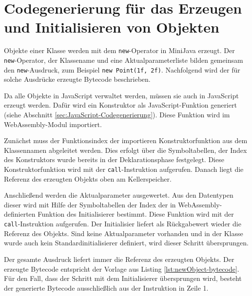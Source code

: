 





\section{Codegenerierung für das Erzeugen und Initialisieren von Objekten}
\label{sec:Codegenerierung-für-das-Erzeugen-und-Initialisieren-von-Objekten}
Objekte einer Klasse werden mit dem \lstinline{new}-Operator in MiniJava erzeugt. Der \lstinline{new}-Operator, der Klassename und eine Aktualparameterliste bilden gemeinsam den \lstinline{new}-Ausdruck, zum Beispiel \lstinline{new Point(1f, 2f)}. Nachfolgend wird der für solche Ausdrücke erzeugte Bytecode beschrieben.

Da alle Objekte in JavaScript verwaltet werden, müssen sie auch in JavaScript erzeugt werden. Dafür wird ein Konstruktor als JavaScript-Funktion generiert (siehe Abschnitt \ref{sec:JavaScript-Codegenerierung}). Diese Funktion wird im WebAssembly-Modul importiert.

Zunächst muss der Funktionsindex der importieren Konstruktorfunktion aus dem Klassennamen abgeleitet werden. Dies erfolgt über die Symboltabellen, der Index des Konstruktors wurde bereits in der Deklarationsphase festgelegt. Diese Konstruktorfunktion wird mit der \lstinline{call}-Instruktion aufgerufen. Danach liegt die Referenz des erzeugten Objekts oben am Kellerspeicher.

Anschließend werden die Aktualparameter ausgewertet. Aus den Datentypen dieser wird mit Hilfe der Symboltabellen der Index der in WebAssembly-definierten Funktion des Initialisierer bestimmt. Diese Funktion wird mit der \lstinline{call}-Instruktion aufgerufen. Der Initialisier liefert als Rückgabewert wieder die Referenz des Objekts. Sind keine Aktualparameter vorhanden und in der Klasse wurde auch kein Standardinitialisierer definiert, wird dieser Schritt übersprungen.

Der gesamte Ausdruck liefert immer die Referenz des erzeugten Objekts. Der erzeugte Bytecode entspricht der Vorlage aus Listing \ref{lst:newObject-bytecode}. Für den Fall, dass der Schritt mit dem Initialisierer übersprungen wird, besteht der generierte Bytecode ausschließlich aus der Instruktion in Zeile 1.

